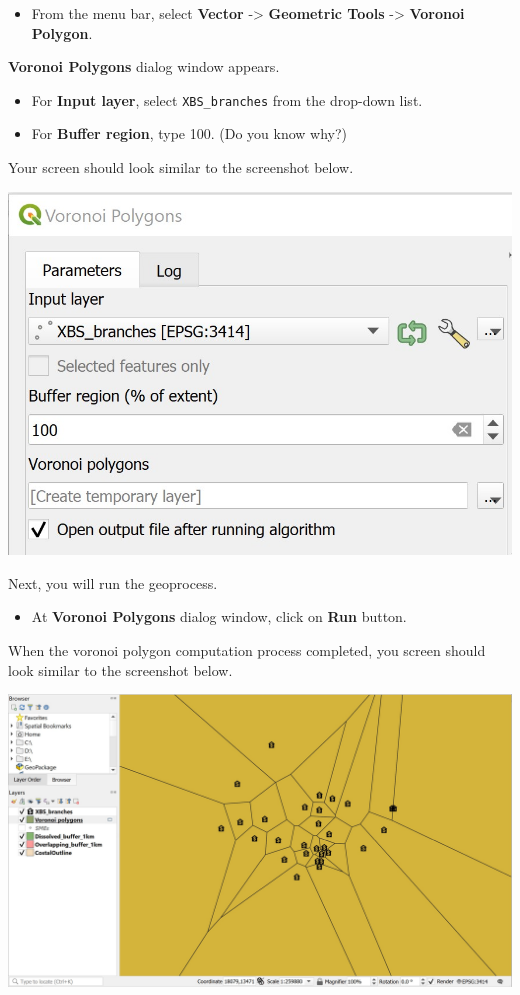 \documentclass[
  letterpaper,
  DIV=11,
  numbers=noendperiod]{scrreprt}
\providecommand{\tightlist}{%
  \setlength{\itemsep}{0pt}\setlength{\parskip}{0pt}}\usepackage{longtable,booktabs,array}
\begin{document}
\begin{itemize}
\tightlist
\item
  From the menu bar, select \textbf{Vector} -\textgreater{}
  \textbf{Geometric Tools} -\textgreater{} \textbf{Voronoi Polygon}.
\end{itemize}

\textbf{Voronoi Polygons} dialog window appears.

\begin{itemize}
\tightlist
\item
  For \textbf{Input layer}, select \texttt{XBS\_branches} from the
  drop-down list.
\item
  For \textbf{Buffer region}, type 100. (Do you know why?)
\end{itemize}

Your screen should look similar to the screenshot below.

\includegraphics{./img05/image21.jpg}

Next, you will run the geoprocess.

\begin{itemize}
\tightlist
\item
  At \textbf{Voronoi Polygons} dialog window, click on \textbf{Run}
  button.
\end{itemize}

When the voronoi polygon computation process completed, you screen
should look similar to the screenshot below.

\includegraphics{./img05/image22.jpg}
\end{document}
